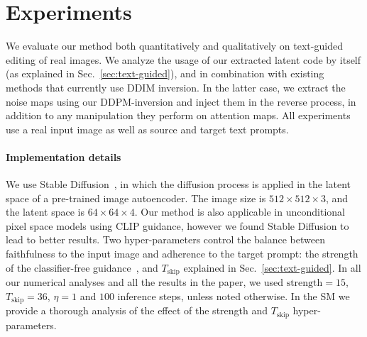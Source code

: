\section{Experiments}
\label{sec:evalution}

We evaluate our method both quantitatively and qualitatively on text-guided editing of real images. We analyze the usage of our extracted latent code by itself (as explained in Sec.~\ref{sec:text-guided}), and in combination with existing methods that currently use DDIM inversion. In the latter case, we extract the noise maps using our DDPM-inversion and inject them in the reverse process, in addition to any manipulation they perform on \eg attention maps. All experiments use a real input image as well as source and target text prompts.%




\vspace{-0.3cm}
\paragraph{Implementation details} We use Stable Diffusion~\cite{Rombach22}, in which the diffusion process is applied in the latent space of a pre-trained image autoencoder. The image size is $512\! \times 512 \!\times \!3$, and the latent space is $64 \! \times 64 \! \times \! 4$. Our method is also applicable in unconditional pixel space models using CLIP guidance, however we found Stable Diffusion to lead to better results. 
Two hyper-parameters control the balance between faithfulness to the input image and adherence to the target prompt: the strength of the classifier-free guidance~\cite{Ho21}, and $T_{\text{skip}}$ explained in Sec.~\ref{sec:text-guided}. In all our numerical analyses and all the results in the paper, we used $\text{strength}\!=\!15$,  $T_{\text{skip}}\!=\!36$, $\eta\!=\!1$ and $100$ inference steps,  unless noted otherwise. 
In the SM we provide a thorough analysis of the effect of the strength and $T_{\text{skip}}$ hyper-parameters.


